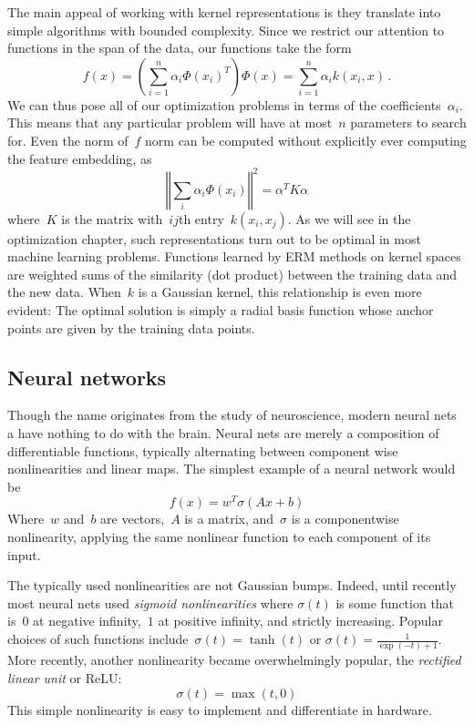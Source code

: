 \documentclass{tufte-book}
\begin{document}
The main appeal of working with kernel representations is they translate
into simple algorithms with bounded complexity. Since we restrict our
attention to functions in the span of the data, our functions take the
form \[
    f(x) = \left(\sum_{i=1}^n \alpha_i \Phi(x_i)^T \right)\Phi(x) = \sum_{i=1}^n \alpha_i k(x_i,x)\,.
\] We can thus pose all of our optimization problems in terms of the
coefficients~\(\alpha_i\). This means that any particular problem will
have at most~\(n\) parameters to search for. Even the norm of~\(f\) norm
can be computed without explicitly ever computing the feature embedding,
as \[
    \left \Vert\sum_i \alpha_i \Phi(x_i)\right\Vert^2 = \alpha^T K \alpha
\] where~\(K\) is the matrix with~\(ij\)th entry~\(k(x_i,x_j)\). As we
will see in the optimization chapter, such representations turn out to
be optimal in most machine learning problems. Functions learned by ERM
methods on kernel spaces are weighted sums of the similarity (dot
product) between the training data and the new data. When~\(k\) is a
Gaussian kernel, this relationship is even more evident: The optimal
solution is simply a radial basis function whose anchor points are given
by the training data points.

\hypertarget{neural-networks}{%
\subsection{Neural networks}\label{neural-networks}}


Though the name originates from the study of neuroscience, modern neural
nets a have nothing to do with the brain. Neural nets are merely a
composition of differentiable functions, typically alternating between
component wise nonlinearities and linear maps. The simplest example of a
neural network would be \[
    f(x) = w^T \sigma(Ax+b)
\] Where~\(w\) and~\(b\) are vectors,~\(A\) is a matrix, and~\(\sigma\)
is a componentwise nonlinearity, applying the same nonlinear function to
each component of its input.

The typically used nonlinearities are not Gaussian bumps. Indeed, until
recently most neural nets used \emph{sigmoid nonlinearities} where
\(\sigma(t)\) is some function that is~\(0\) at negative infinity,~\(1\)
at positive infinity, and strictly increasing. Popular choices of such
functions include~\(\sigma(t) = \tanh(t)\) or
\(\sigma(t) = \frac{1}{\exp(-t)+1}\). More recently, another
nonlinearity became overwhelmingly popular, the \emph{rectified linear
unit} or ReLU: \[
    \sigma(t) = \max(t,0)
\] This simple nonlinearity is easy to implement and differentiate in
hardware.
\end{document}
